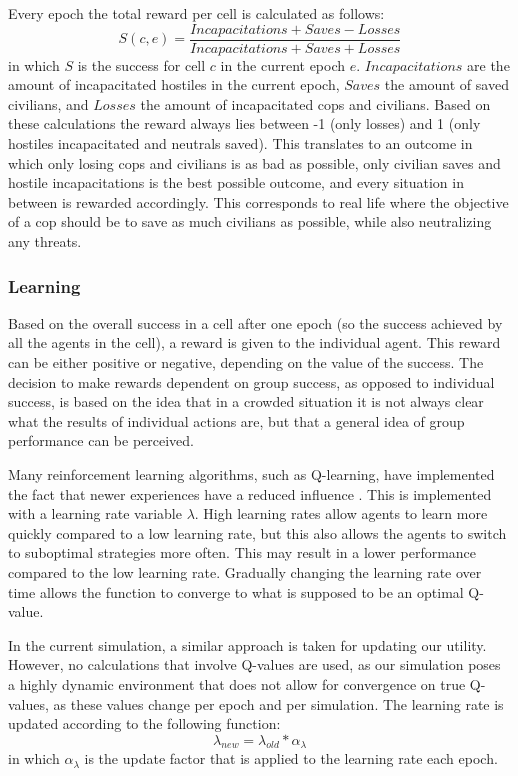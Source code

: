 Every epoch the total reward per cell is calculated as follows:
\begin{equation} \label{eq:reward}
S(c, e) = \frac{Incapacitations + Saves - Losses}{Incapacitations + Saves + Losses}
\end{equation}
in which $S$ is the success for cell $c$ in the current epoch $e$. $Incapacitations$ are the amount of incapacitated hostiles in the current epoch, $Saves$ the amount of saved civilians, and $Losses$ the amount of incapacitated cops and civilians.
Based on these calculations the reward always lies between -1 (only losses) and 1 (only hostiles incapacitated and neutrals saved).
This translates to an outcome in which only losing cops and civilians is as bad as possible,
only civilian saves and hostile incapacitations is the best possible outcome,
and every situation in between is rewarded accordingly.
This corresponds to real life where the objective of a cop should be to save as much civilians as possible, 
while also neutralizing any threats.

\subsubsection{Learning}
Based on the overall success in a cell after one epoch (so the success achieved by all the agents in the cell), a reward is given to the individual agent.
This reward can be either positive or negative, depending on the value of the success.
The decision to make rewards dependent on group success, as opposed to individual success, is based on the idea that in a crowded situation it is not always clear what the results of individual actions are, but that a general idea of group performance can be perceived.

Many reinforcement learning algorithms, such as Q-learning, have implemented the fact that newer experiences have a reduced influence  \citep*{watkins1992q}.
This is implemented with a learning rate variable $\lambda$.
High learning rates allow agents to learn more quickly compared to a low learning rate, but this also allows the agents to switch to suboptimal strategies more often.
This may result in a lower performance compared to the low learning rate.
Gradually changing the learning rate over time allows the function to converge to what is supposed to be an optimal Q-value.

In the current simulation, a similar approach is taken for updating our utility.
However, no calculations that involve Q-values are used,
as our simulation poses a highly dynamic environment that does not allow for convergence on true Q-values,
as these values change per epoch and per simulation.
The learning rate is updated according to the following function:
\begin{equation} \label{eq:lambda}
\lambda_{new} = \lambda_{old} * \alpha_{\lambda}
\end{equation}
in which $\alpha_\lambda$ is the update factor that is applied to the learning rate each epoch.

